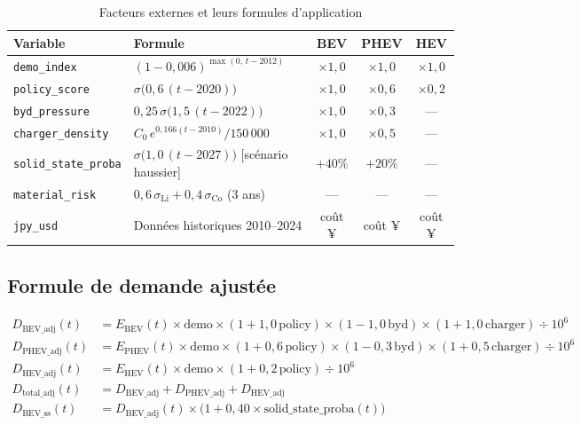 \documentclass[12pt,a4paper]{article}
\begin{document}
\begin{table}[H]
\centering
\caption{Facteurs externes et leurs formules d'application}
\begin{tabular}{lp{5.5cm}ccc}
\toprule
\textbf{Variable} & \textbf{Formule} & \textbf{BEV} & \textbf{PHEV} & \textbf{HEV} \\
\midrule
\texttt{demo\_index}
  & $(1-0{,}006)^{\max(0,\,t-2012)}$
  & $\times 1{,}0$ & $\times 1{,}0$ & $\times 1{,}0$ \\
\texttt{policy\_score}
  & $\sigma\!\bigl(0{,}6\,(t-2020)\bigr)$
  & $\times 1{,}0$ & $\times 0{,}6$ & $\times 0{,}2$ \\
\texttt{byd\_pressure}
  & $0{,}25\,\sigma\!\bigl(1{,}5\,(t-2022)\bigr)$
  & $\times 1{,}0$ & $\times 0{,}3$ & --- \\
\texttt{charger\_density}
  & $C_0\,e^{0{,}166(t-2010)}/150\,000$
  & $\times 1{,}0$ & $\times 0{,}5$ & --- \\
\texttt{solid\_state\_proba}
  & $\sigma\!\bigl(1{,}0\,(t-2027)\bigr)$ [scénario haussier]
  & $+40\%$ & $+20\%$ & --- \\
\texttt{material\_risk}
  & $0{,}6\,\sigma_{\text{Li}} + 0{,}4\,\sigma_{\text{Co}}$ (3 ans)
  & --- & --- & --- \\
\texttt{jpy\_usd}
  & Données historiques 2010--2024
  & coût ¥ & coût ¥ & coût ¥ \\
\bottomrule
\end{tabular}
\end{table}

\subsection{Formule de demande ajustée}

\begin{formulebox}
\begin{align}
D_{\text{BEV\_adj}}(t)  &= E_{\text{BEV}}(t) \times \text{demo}
  \times (1 + 1{,}0\,\text{policy}) \times (1 - 1{,}0\,\text{byd})
  \times (1 + 1{,}0\,\text{charger}) \div 10^6 \tag{6} \\[4pt]
D_{\text{PHEV\_adj}}(t) &= E_{\text{PHEV}}(t) \times \text{demo}
  \times (1 + 0{,}6\,\text{policy}) \times (1 - 0{,}3\,\text{byd})
  \times (1 + 0{,}5\,\text{charger}) \div 10^6 \tag{7} \\[4pt]
D_{\text{HEV\_adj}}(t)  &= E_{\text{HEV}}(t)  \times \text{demo}
  \times (1 + 0{,}2\,\text{policy}) \div 10^6 \tag{8} \\[4pt]
D_{\text{total\_adj}}(t) &= D_{\text{BEV\_adj}} + D_{\text{PHEV\_adj}} + D_{\text{HEV\_adj}} \tag{9} \\[4pt]
D_{\text{BEV\_ss}}(t)   &= D_{\text{BEV\_adj}}(t)
  \times \bigl(1 + 0{,}40 \times \text{solid\_state\_proba}(t)\bigr) \tag{10}
\end{align}
\end{formulebox}
\end{document}
